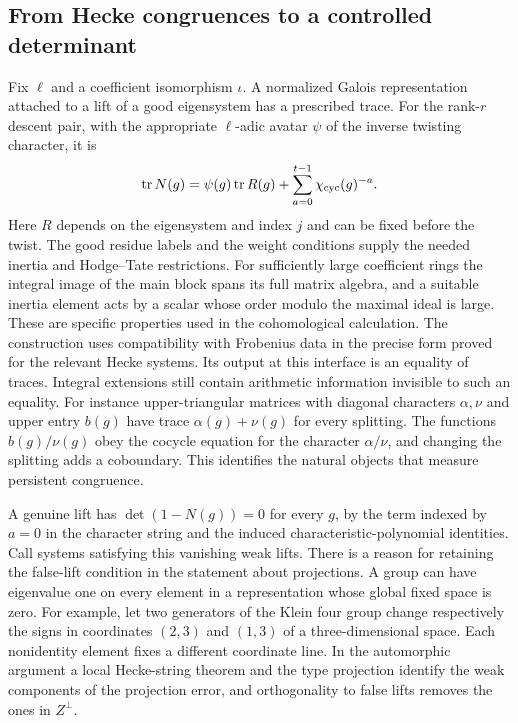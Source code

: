 \subsection{From Hecke congruences to a controlled determinant}
Fix $\ell$ and a coefficient isomorphism $\iota$. A normalized Galois representation attached to a lift of a good eigensystem has a prescribed trace. For the rank-$r$ descent pair, with the appropriate $\ell$-adic avatar $\psi$ of the inverse twisting character, it is
\[
 \operatorname{tr} N(g)=\psi(g)\operatorname{tr} R(g)
              +\sum_{a=0}^{t-1}\chi_{\rm cyc}(g)^{-a}.
\]
Here $R$ depends on the eigensystem and index $j$ and can be fixed before the twist. The good residue labels and the weight conditions supply the needed inertia and Hodge--Tate restrictions. For sufficiently large coefficient rings the integral image of the main block spans its full matrix algebra, and a suitable inertia element acts by a scalar whose order modulo the maximal ideal is large. These are specific properties used in the cohomological calculation. The construction uses compatibility with Frobenius data in the precise form proved for the relevant Hecke systems. Its output at this interface is an equality of traces. Integral extensions still contain arithmetic information invisible to such an equality. For instance upper-triangular matrices with diagonal characters $\alpha,\nu$ and upper entry $b(g)$ have trace $\alpha(g)+\nu(g)$ for every splitting. The functions $b(g)/\nu(g)$ obey the cocycle equation for the character $\alpha/\nu$, and changing the splitting adds a coboundary. This identifies the natural objects that measure persistent congruence.

A genuine lift has $\det(1-N(g))=0$ for every $g$, by the term indexed by $a=0$ in the character string and the induced characteristic-polynomial identities. Call systems satisfying this vanishing weak lifts. There is a reason for retaining the false-lift condition in the statement about projections. A group can have eigenvalue one on every element in a representation whose global fixed space is zero. For example, let two generators of the Klein four group change respectively the signs in coordinates $(2,3)$ and $(1,3)$ of a three-dimensional space. Each nonidentity element fixes a different coordinate line. In the automorphic argument a local Hecke-string theorem and the type projection identify the weak components of the projection error, and orthogonality to false lifts removes the ones in $Z^\perp$.

